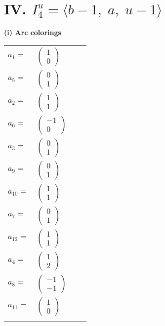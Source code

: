 \documentclass[1p]{elsarticle_modified}
\theoremstyle{definition}
\begin{document}
\centering \section*{IV. $I^u_{4}= \langle b-1,\;a,\;u-1 \rangle$}
\flushleft \textbf{(i) Arc colorings}\\
\begin{tabular}{m{7pt} m{180pt} m{7pt} m{180pt} }
\flushright $a_{1}=$&$\begin{pmatrix}1\\0\end{pmatrix}$ \\
\flushright $a_{5}=$&$\begin{pmatrix}0\\1\end{pmatrix}$ \\
\flushright $a_{2}=$&$\begin{pmatrix}1\\1\end{pmatrix}$ \\
\flushright $a_{6}=$&$\begin{pmatrix}-1\\0\end{pmatrix}$ \\
\flushright $a_{3}=$&$\begin{pmatrix}0\\1\end{pmatrix}$ \\
\flushright $a_{9}=$&$\begin{pmatrix}0\\1\end{pmatrix}$ \\
\flushright $a_{10}=$&$\begin{pmatrix}1\\1\end{pmatrix}$ \\
\flushright $a_{7}=$&$\begin{pmatrix}0\\1\end{pmatrix}$ \\
\flushright $a_{12}=$&$\begin{pmatrix}1\\1\end{pmatrix}$ \\
\flushright $a_{4}=$&$\begin{pmatrix}1\\2\end{pmatrix}$ \\
\flushright $a_{8}=$&$\begin{pmatrix}-1\\-1\end{pmatrix}$ \\
\flushright $a_{11}=$&$\begin{pmatrix}1\\0\end{pmatrix}$\\&\end{tabular}
\end{document}
